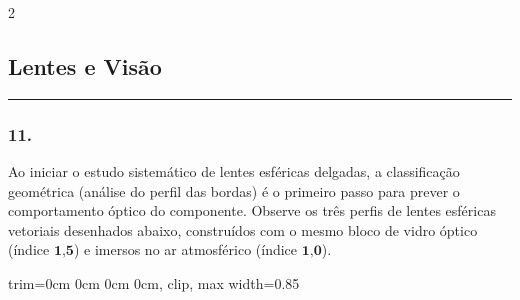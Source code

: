 \documentclass[twoside, 10pt, a4paper]{article}
\newlength{\espacoPosTitulo}\setlength{\espacoPosTitulo}{0.3cm}
\newcommand{\larguraTikz}{0.85\linewidth}
\begin{document}
\begin{multicols*}{2}
\subsection*{Lentes e Visão}
\vspace{-0.2cm}\noindent\rule{\linewidth}{1.5pt} 
\par\vspace{\espacoPosTitulo}

\subsubsection*{11.} Ao iniciar o estudo sistemático de lentes esféricas delgadas, a classificação geométrica (análise do perfil das bordas) é o primeiro passo para prever o comportamento óptico do componente. Observe os três perfis de lentes esféricas vetoriais desenhados abaixo, construídos com o mesmo bloco de vidro óptico (índice $ \textbf{1,5} $) e imersos no ar atmosférico (índice $ \textbf{1,0} $).
\begin{center}
\begin{adjustbox}{trim=0cm 0cm 0cm 0cm, clip, max width=\larguraTikz}
\end{adjustbox}
\end{center}
\end{multicols*}
\end{document}

